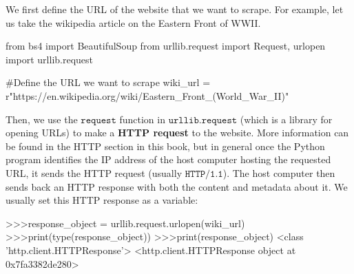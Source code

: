 \documentclass{article}
\begin{document}
  We first define the URL of the website that we want to scrape. For example, let us take the wikipedia article on the Eastern Front of WWII. 
  \begin{python}
  from bs4 import BeautifulSoup
  from urllib.request import Request, urlopen
  import urllib.request

  #Define the URL we want to scrape
  wiki_url = r"https://en.wikipedia.org/wiki/Eastern_Front_(World_War_II)"
  \end{python}
  Then, we use the $\texttt{request}$ function in $\texttt{urllib.request}$ (which is a library for opening URLs) to make a \textbf{HTTP request} to the website. More information can be found in the HTTP section in this book, but in general once the Python program identifies the IP address of the host computer hosting the requested URL, it sends the HTTP request (usually $\texttt{HTTP/1.1}$). The host computer then sends back an HTTP response with both the content and metadata about it. We usually set this HTTP response as a variable: 
  \begin{python}
  >>>response_object = urllib.request.urlopen(wiki_url)
  >>>print(type(response_object)) 
  >>>print(response_object)
  <class 'http.client.HTTPResponse'>
  <http.client.HTTPResponse object at 0x7fa3382de280>
  \end{python}
\end{document}
